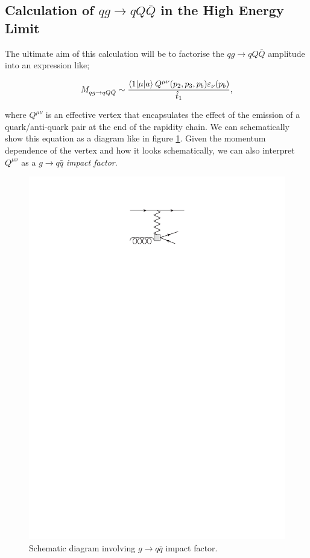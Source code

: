 \subsection{Calculation of $qg \to qQ\bar{Q}$ in the High Energy Limit}

The ultimate aim of this calculation will be to factorise the $qg \to qQ\bar{Q}$ amplitude into an expression like;

\begin{equation}
M_{qg \to qQ\bar{Q}} \sim \frac{\mathinner{\langle1\vert\mu\vert a\rangle}_{}Q^{\mu \nu}(p_2, p_3, p_b) \varepsilon_\nu(p_b)}{\hat{t}_1},
\label{eqn:NLLeqn}
\end{equation}

where $Q^{\mu \nu}$ is an effective vertex that encapsulates the effect of the emission of a quark/anti-quark pair at the end of the rapidity chain. We can schematically show this equation as a diagram like in figure \ref{fig:qgimp}. Given the momentum dependence of the vertex and how it looks schematically, we can also interpret $Q^{\mu \nu}$ as a $g \to q \bar{q}$ \emph{impact factor}.

\begin{figure}[t]
\centering
\includegraphics{Images/g_q_qbar_imp.pdf}
\caption{Schematic diagram involving $g \to q \bar{q}$ impact factor.}
\label{fig:qgimp}
\end{figure}

